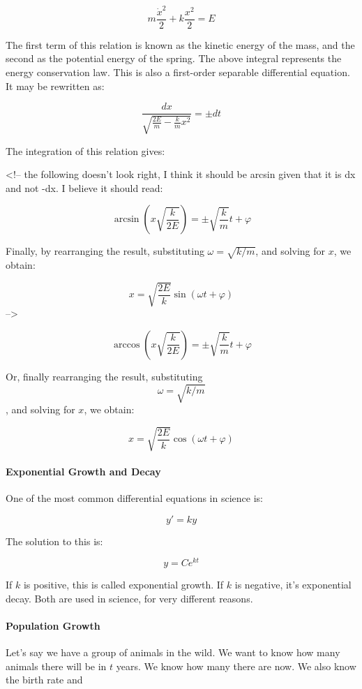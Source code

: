 $$m\frac{{\dot{x}}^2}{2} + k\frac{x^2}{2} = E$$

The first term of this relation is known as the kinetic energy of the mass, and the second as the potential energy of the spring. The above integral represents the energy conservation law. This is also a first-order separable differential equation. It may be rewritten as:

$$\frac{dx}{\sqrt{\frac{2E}{m} - \frac{k}{m}x^2}} = \pm dt$$

The integration of this relation gives:

<!-- the following doesn't look right, I think it should be arcsin given that it is dx and not -dx. I believe it should read:

$$\arcsin \left(x\sqrt{\frac{k}{2E}}\right) = \pm \sqrt{\frac{k}{m}} t + \varphi$$

Finally, by rearranging the result, substituting $\omega = \sqrt{k/m}$, and solving for $x$, we obtain:

$$x = \sqrt{\frac{2E}{k}}\sin(\omega t + \varphi)$$
-->

$$\arccos \left(x\sqrt{\frac{k}{2E}}\right) = \pm \sqrt{\frac{k}{m}} t + \varphi$$

Or, finally rearranging the result, substituting $$\omega = \sqrt{k/m}$$, and solving for $x$, we obtain:

$$x = \sqrt{\frac{2E}{k}}\cos (\omega t + \varphi)$$

\paragraph{Exponential Growth and Decay}

One of the most common differential equations in science is:

$$y' = ky$$

The solution to this is:

$$y = Ce^{kt}$$

If $k$ is positive, this is called exponential growth. If $k$ is negative, it’s exponential decay. Both are used in science, for very different reasons.

\paragraph{Population Growth}

Let's say we have a group of animals in the wild. We want to know how many animals there will be in $t$ years. We know how many there are now. We also know the birth rate and

